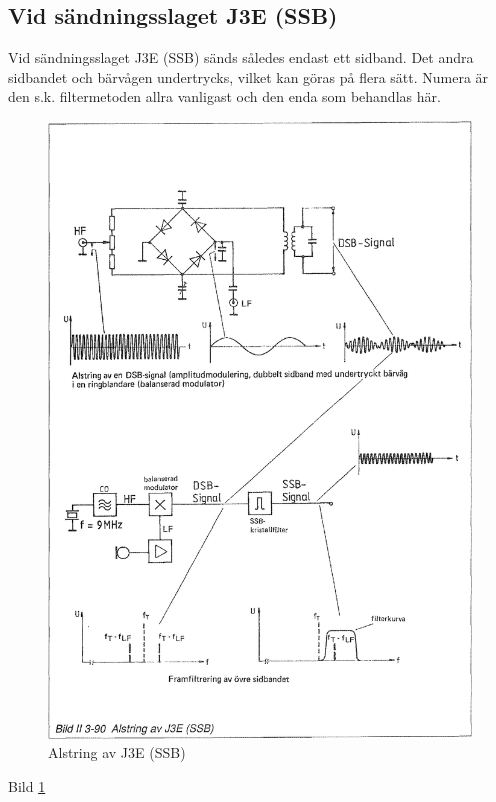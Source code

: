 \subsection{Vid sändningsslaget J3E (SSB)}

Vid sändningsslaget J3E (SSB) sänds således endast ett sidband. Det
andra sidbandet och bärvågen undertrycks, vilket kan göras på flera
sätt. Numera är den s.k. filtermetoden allra vanligast och den enda
som behandlas här.

\begin{figure}
\includegraphics[width=\textwidth]{images/bild_2_3-90}
\caption{Alstring av J3E (SSB)}
\label{fig:BildII3-90}
\end{figure}

Bild \ref{fig:BildII3-90}

